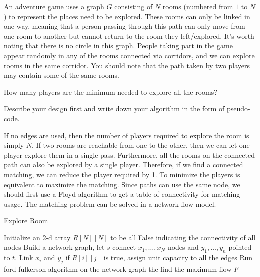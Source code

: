 \begin{exercise}[]{An adventure game uses a graph $G$ consisting of $N$ rooms (numbered from $1$ to $N$) to represent the places need to be explored. These rooms can only be linked in one-way, meaning that a person passing through this path can only move from one room to another but cannot return to the room they left/explored. It’s worth noting that there is no circle in this graph. People taking part in the game appear randomly in any of the rooms connected via corridors, and we can explore rooms in the same corridor. You should note that the path taken by two players may contain some of the same rooms.

    How many players are the minimum needed to explore all the rooms?
    
    Describe your design first and write down your algorithm in the form of pseudo-code.}
  \begin{solution} If no edges are used, then the number of players required to explore the room is simply $N$. If two rooms are reachable from one to the other, then we can let one player explore them in a single pass. Furthermore, all the rooms on the connected path can also be explored by a single player. Therefore, if we find a connected matching, we can reduce the player required by 1. To minimize the players is equivalent to maximize the matching. Since paths can use the same node, we should first use a Floyd algorithm to get a table of connectivity for matching usage. The matching problem can be solved in a network flow model.

  \begin{algorithm}[h]
    \caption{Explore Room}
    \BlankLine
    Initialize an 2-d array $R[N][N]$ to be all False indicating the connectivity of all nodes\;
    Build a network graph, let $s$ connect $x_1,\ldots,x_N$ nodes and $y_1,\ldots,y_n$ pointed to $t$.\;
    Link $x_i$ and $y_j$ if $R[i][j]$ is true, assign unit capacity to all the edges\;
    Run ford-fulkerson algorithm on the network graph the find the maximum flow $F$\;
    \;
  \end{algorithm}
  \end{solution}
  \label{ex1}
\end{exercise}


